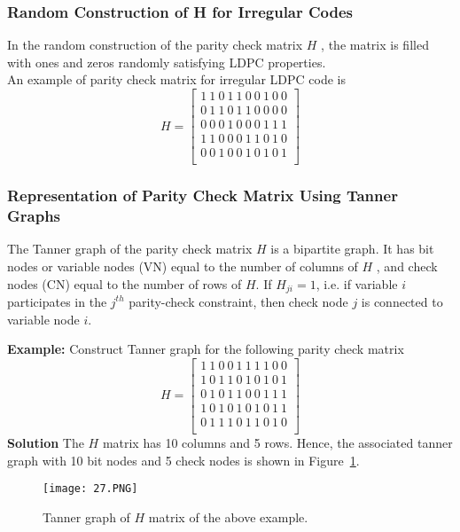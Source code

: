 \subsubsection{Random Construction of H for Irregular Codes}
In the random construction of the parity check matrix $H$ , the matrix is filled with ones and zeros randomly satisfying LDPC properties.\\
An example of parity check matrix for irregular LDPC code is
\[H=\left[\begin{matrix}1\ 1\ 0\ 1\ 1\ 0\ 0\ 1\ 0\ 0\\0\ 1\ 1\ 0\ 1\ 1\ 0\ 0\ 0\ 0\\0\ 0\ 0\ 1\ 0\ 0\ 0\ 1\ 1\ 1\\1\ 1\ 0\ 0\ 0\ 1\ 1\ 0\ 1\ 0\\0\ 0\ 1\ 0\ 0\ 1\ 0\ 1\ 0\ 1\\\end{matrix}\right]\]

\subsubsection{Representation of Parity Check Matrix Using Tanner Graphs}

The Tanner graph of the parity check matrix $H$ is a bipartite graph. It has bit nodes or variable nodes (VN) equal to the number of columns of $H$ , and check nodes (CN) equal to the number of rows of $H$. If $H_{ji}= 1$, i.e. if variable $i$ participates in the $j^{th}$ parity-check constraint, then check node $j$ is connected to variable node $i$.

\textbf{Example:} Construct Tanner graph for the following parity check matrix
\[H=\left[\begin{matrix}1\ 1\ 0\ 0\ 1\ 1\ 1\ 1\ 0\ 0\\1\ 0\ 1\ 1\ 0\ 1\ 0\ 1\ 0\ 1\\0\ 1\ 0\ 1\ 1\ 0\ 0\ 1\ 1\ 1\\1\ 0\ 1\ 0\ 1\ 0\ 1\ 0\ 1\ 1\\0\ 1\ 1\ 1\ 0\ 1\ 1\ 0\ 1\ 0\\\end{matrix}\right]\]
\textbf{Solution} The $H$ matrix has 10 columns and 5 rows. Hence, the associated tanner graph with 10 bit nodes and 5 check nodes is shown in Figure~\ref{fig:Tanner graph}.
\begin{figure}[h]
\centering
\texttt{[image: 27.PNG]}
\caption{Tanner graph of $H$ matrix of the above example.}
\label{fig:Tanner graph}
\end{figure}


